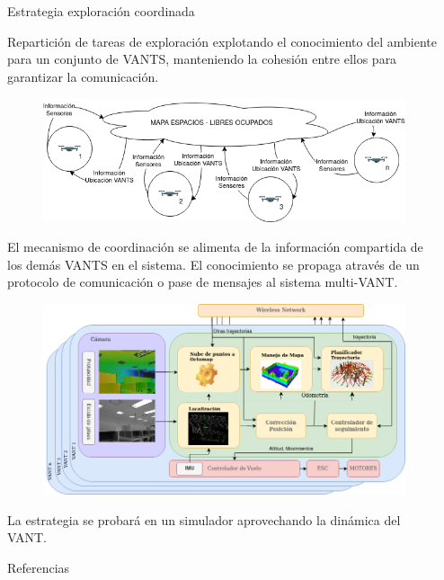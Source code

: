 \documentclass[final]{beamer}
\newlength{\sepwidth}
\newlength{\colwidth}
\newcommand{\separatorcolumn}{\begin{column}{\sepwidth}\end{column}}
\begin{document}
\begin{frame}[t]
\begin{columns}[t]
\begin{column}{\colwidth}
  \begin{block}{\color{teal}Estrategia exploración coordinada}

    Repartición de tareas de exploración explotando el conocimiento del ambiente para un conjunto de VANTS, manteniendo la cohesión entre ellos para garantizar la comunicación. \cite{LEAL2013}
    \begin{figure}
      \centering
      \includegraphics[width=32cm]{images/problema.png}
    \end{figure}
    El mecanismo de coordinación se alimenta de la información compartida de los demás VANTS en el sistema. El conocimiento se propaga através de un protocolo de comunicación o pase de mensajes al sistema multi-VANT.
    \begin{figure}
      \centering
      \includegraphics[width=32cm]{images/arquitectura.png}
    \end{figure}
  \end{block}
  La estrategia se probará en un simulador aprovechando la dinámica del VANT. \vspace{1cm}
  \begin{block}{\small{\color{teal}Referencias}}
    \begin{multicols}{3}
   \nocite{*}
    \tiny{}
    \end{multicols}
  \end{block}

\end{column}

\separatorcolumn
\end{columns}
\end{frame}
\end{document}
